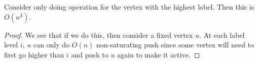 \begin{lemma}
	Consider only doing operation for the vertex with the highest label. Then this is \(O(n^3)\).
\end{lemma}
\begin{proof}
	We see that if we do this, then consider a fixed vertex \(u\). At each label level \(i\), \(u\) can only do \(O(n)\) non-saturating push since some vertex will need to first go higher than \(i\) and push to \(u\) again to make it active.
\end{proof}